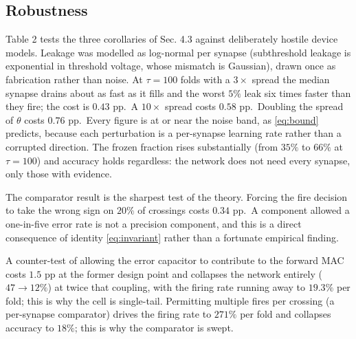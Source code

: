 \documentclass[11pt]{article}
\begin{document}
\hypertarget{robustness}{%
\subsection{Robustness}\label{robustness}}

Table 2 tests the three corollaries of Sec. 4.3 against deliberately
hostile device models. Leakage was modelled as log-normal per synapse
(subthreshold leakage is exponential in threshold voltage, whose
mismatch is Gaussian), drawn once as fabrication rather than noise. At
\(\tau = 100\) folds with a \(3\times\) spread the median synapse drains
about as fast as it fills and the worst \(5\%\) leak six times faster
than they fire; the cost is \(0.43\) pp.~A \(10\times\) spread costs
\(0.58\) pp.~Doubling the spread of \(\theta\) costs \(0.76\) pp.~Every
figure is at or near the noise band, as \eqref{eq:bound} predicts, because each
perturbation is a per-synapse learning rate rather than a corrupted
direction. The frozen fraction rises substantially (from \(35\%\) to
\(66\%\) at \(\tau=100\)) and accuracy holds regardless: the network
does not need every synapse, only those with evidence.

The comparator result is the sharpest test of the theory. Forcing the
fire decision to take the wrong sign on \(20\%\) of crossings costs
\(0.34\) pp.~A component allowed a one-in-five error rate is not a
precision component, and this is a direct consequence of identity \eqref{eq:invariant}
rather than a fortunate empirical finding.

A counter-test of allowing the error capacitor to contribute to the
forward MAC costs \(1.5\) pp at the former design point and collapses
the network entirely (\(47 \to 12\%\)) at twice that coupling, with the
firing rate running away to \(19.3\%\) per fold; this is why the cell is
single-tail. Permitting multiple fires per crossing (a per-synapse
comparator) drives the firing rate to \(271\%\) per fold and collapses
accuracy to \(18\%\); this is why the comparator is swept.
\end{document}
